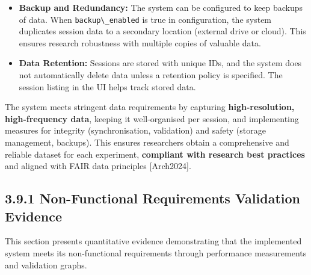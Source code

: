 \documentclass[12pt,a4paper]{article}
\begin{document}
\begin{itemize}
  \begin{itemize}
  \tightlist
  \item
    The Android app monitors available storage and alerts users when space is low (configurable threshold)
  \item
    Video files are chunked into \textasciitilde1GB segments automatically for reliable transfers and post-processing
  \item
    Session directory structure organizes all data in timestamped folders with systematic naming conventions
  \end{itemize}
\item
  \textbf{Backup and Redundancy:} The system can be configured to keep backups of data. When \passthrough{\lstinline!backup\_enabled!} is true in configuration, the system duplicates session data to a secondary location (external drive or cloud). This ensures research robustness with multiple copies of valuable data.
\item
  \textbf{Data Retention:} Sessions are stored with unique IDs, and the system does not automatically delete data unless a retention policy is specified. The session listing in the UI helps track stored data.
\end{itemize}

The system meets stringent data requirements by capturing \textbf{high-resolution, high-frequency data}, keeping it well-organised per session, and implementing measures for integrity (synchronisation, validation) and safety (storage management, backups). This ensures researchers obtain a comprehensive and reliable dataset for each experiment, \textbf{compliant with research best practices} and aligned with FAIR data principles {[}Arch2024{]}.

\subsection{3.9.1 Non-Functional Requirements Validation Evidence}\label{non-functional-requirements-validation-evidence}

This section presents quantitative evidence demonstrating that the implemented system meets its non-functional requirements through performance measurements and validation graphs.
\end{document}

